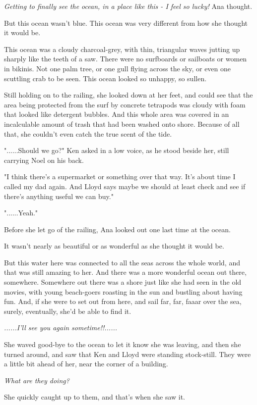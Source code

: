 \documentclass[
]{article}
\begin{document}
\emph{Getting to finally see the ocean, in a place like this - I feel so
lucky!} Ana thought.

But this ocean wasn't blue. This ocean was very different from how she
thought it would be.

This ocean was a cloudy charcoal-grey, with thin, triangular waves
jutting up sharply like the teeth of a saw. There were no surfboards or
sailboats or women in bikinis. Not one palm tree, or one gull flying
across the sky, or even one scuttling crab to be seen. This ocean looked
so unhappy, so sullen.

Still holding on to the railing, she looked down at her feet, and could
see that the area being protected from the surf by concrete tetrapods
was cloudy with foam that looked like detergent bubbles. And this whole
area was covered in an incalculable amount of trash that had been washed
onto shore. Because of all that, she couldn't even catch the true scent
of the tide.

"......Should we go?" Ken asked in a low voice, as he stood beside her,
still carrying Noel on his back.

"I think there's a supermarket or something over that way. It's about
time I called my dad again. And Lloyd says maybe we should at least
check and see if there's anything useful we can buy."

"......Yeah."

Before she let go of the railing, Ana looked out one last time at the
ocean.

It wasn't nearly as beautiful or as wonderful as she thought it would
be.

But this water here was connected to all the seas across the whole
world, and that was still amazing to her. And there was a more wonderful
ocean out there, somewhere. Somewhere out there was a shore just like
she had seen in the old movies, with young beach-goers roasting in the
sun and bustling about having fun. And, if she were to set out from
here, and sail far, far, faaar over the sea, surely, eventually, she'd
be able to find it.

\emph{......I'll see you again sometime!!......}

She waved good-bye to the ocean to let it know she was leaving, and then
she turned around, and saw that Ken and Lloyd were standing stock-still.
They were a little bit ahead of her, near the corner of a building.

\emph{What are they doing?}

She quickly caught up to them, and that's when she saw it.
\end{document}
